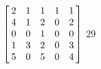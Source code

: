 {$\left[\hskip -3pt \begin{array}{ccccc} 2&1&1&1&1\\  4&1&2&0&2
\\  0&0&1&0&0\\  1&3&2&0&3
\\  5&0&5&0&4\end{array}\hskip -3pt \right] $} 
{$29$}



  

